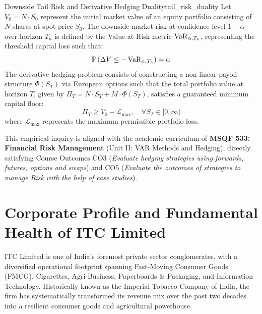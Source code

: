\begin{definition}{Downside Tail Risk and Derivative Hedging Duality}{tail_risk_duality}
Let $V_0 = N \cdot S_0$ represent the initial market value of an equity portfolio consisting of $N$ shares at spot price $S_0$. The downside market risk at confidence level $1 - \alpha$ over horizon $T_h$ is defined by the Value at Risk metric $\operatorname{VaR}_{\alpha, T_h}$, representing the threshold capital loss such that:
\begin{equation}
\mathbb{P}\left(\Delta V \le -\operatorname{VaR}_{\alpha, T_h}\right) = \alpha
\end{equation}
The derivative hedging problem consists of constructing a non-linear payoff structure $\Phi(S_T)$ via European options such that the total portfolio value at horizon $T$, given by $\Pi_T = N \cdot S_T + M \cdot \Phi(S_T)$, satisfies a guaranteed minimum capital floor:
\begin{equation}
\Pi_T \ge V_0 - \mathcal{L}_{\max}, \quad \forall S_T \in [0, \infty)
\end{equation}
where $\mathcal{L}_{\max}$ represents the maximum permissible portfolio loss.
\end{definition}

This empirical inquiry is aligned with the academic curriculum of \textbf{MSQF 533: Financial Risk Management} (Unit II: VAR Methods and Hedging), directly satisfying Course Outcomes CO3 (\textit{Evaluate hedging strategies using forwards, futures, options and swaps}) and CO5 (\textit{Evaluate the outcomes of strategies to manage Risk with the help of case studies}).

\section{Corporate Profile and Fundamental Health of ITC Limited}
\label{sec:itc_profile}

ITC Limited is one of India's foremost private sector conglomerates, with a diversified operational footprint spanning Fast-Moving Consumer Goods (FMCG), Cigarettes, Agri-Business, Paperboards \& Packaging, and Information Technology. Historically known as the Imperial Tobacco Company of India, the firm has systematically transformed its revenue mix over the past two decades into a resilient consumer goods and agricultural powerhouse.

